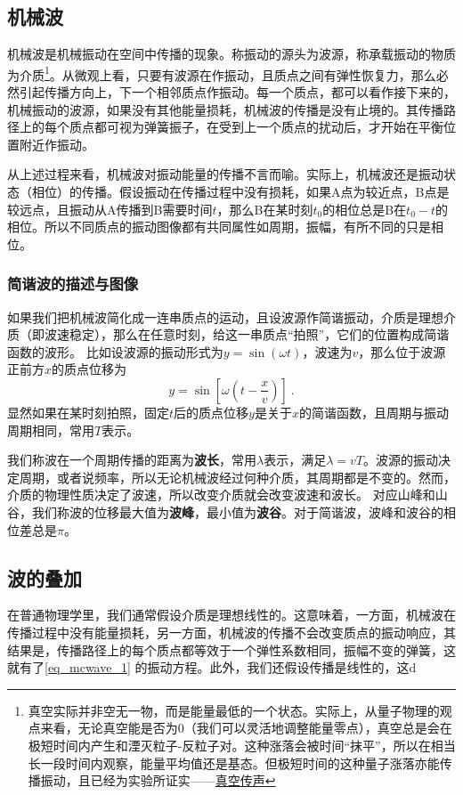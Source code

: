 
\subsection{机械波}
机械波是机械振动在空间中传播的现象。称振动的源头为波源，称承载振动的物质为介质\footnote{真空实际并非空无一物，而是能量最低的一个状态。实际上，从量子物理的观点来看，无论真空能是否为0（我们可以灵活地调整能量零点），真空总是会在极短时间内产生和湮灭粒子-反粒子对。这种涨落会被时间“抹平”，所以在相当长一段时间内观察，能量平均值还是基态。但极短时间的这种量子涨落亦能传播振动，且已经为实验所证实——\href{https://www.rmzxw.com.cn/c/2023-08-25/3399291.shtml}{真空传声}}。从微观上看，只要有波源在作振动，且质点之间有弹性恢复力，那么必然引起传播方向上，下一个相邻质点作振动。每一个质点，都可以看作接下来的，机械振动的波源，如果没有其他能量损耗，机械波的传播是没有止境的。其传播路径上的每个质点都可视为弹簧振子，在受到上一个质点的扰动后，才开始在平衡位置附近作振动。

从上述过程来看，机械波对振动能量的传播不言而喻。实际上，机械波还是振动状态（相位）的传播。假设振动在传播过程中没有损耗，如果A点为较近点，B点是较远点，且振动从A传播到B需要时间$t$，那么B在某时刻$t_0$的相位总是B在$t_0-t$的相位。所以不同质点的振动图像都有共同属性如周期，振幅，有所不同的只是相位。
\subsubsection{简谐波的描述与图像}
如果我们把机械波简化成一连串质点的运动，且设波源作简谐振动，介质是理想介质（即波速稳定），那么在任意时刻，给这一串质点“拍照”，它们的位置构成简谐函数的波形。
比如设波源的振动形式为$y=\sin(\omega t)$，波速为$v$，那么位于波源正前方$x$的质点位移为
\begin{equation}\label{eq_mcwave_1}
y=\sin [\omega (t-\frac{x}{v})]~.
\end{equation}
显然如果在某时刻拍照，固定$t$后的质点位移$y$是关于$x$的简谐函数，且周期与振动周期相同，常用$T$表示。%

我们称波在一个周期传播的距离为\textbf{波长}，常用$\lambda $表示，满足$\lambda=vT$。波源的振动决定周期，或者说频率，所以无论机械波经过何种介质，其周期都是不变的。然而，介质的物理性质决定了波速，所以改变介质就会改变波速和波长。
对应山峰和山谷，我们称波的位移最大值为\textbf{波峰}，最小值为\textbf{波谷}。对于简谐波，波峰和波谷的相位差总是$\pi$。

\subsection{波的叠加}
在普通物理学里，我们通常假设介质是理想线性的。这意味着，一方面，机械波在传播过程中没有能量损耗，另一方面，机械波的传播不会改变质点的振动响应，其结果是，传播路径上的每个质点都等效于一个弹性系数相同，振幅不变的弹簧，这就有了\autoref{eq_mcwave_1} 的振动方程。此外，我们还假设传播是线性的，这d

